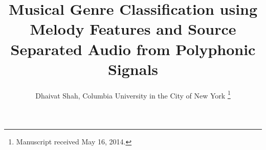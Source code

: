 \documentclass[12pt,journal,compsoc]{IEEEtran}
\begin{document}
%
\title{Musical Genre Classification using Melody Features and Source Separated Audio from Polyphonic Signals}
%
%
%
%

\author{Dhaivat Shah, Columbia University in the City of New York%
\thanks{Manuscript received May 16, 2014.}}

% 
%
\end{document}

